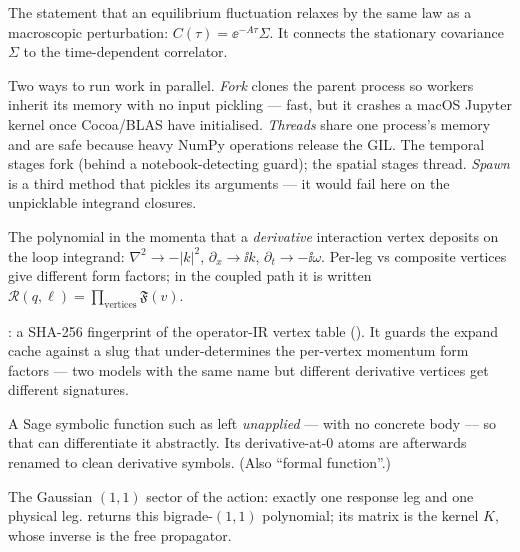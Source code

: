 \begin{description}[leftmargin=0pt,style=nextline]
  \item[Fluctuation--regression (Onsager regression) theorem] The statement that an
        equilibrium fluctuation relaxes by the same law as a macroscopic
        perturbation: $C(\tau)=\ee^{-A\tau}\Sigma$. It connects the stationary
        covariance $\Sigma$ to the time-dependent correlator.

  \item[Fork vs thread parallelism] Two ways to run work in parallel. \emph{Fork}
        clones the parent process so workers inherit its memory with no input
        pickling --- fast, but it crashes a macOS Jupyter kernel once Cocoa/BLAS
        have initialised. \emph{Threads} share one process's memory and are safe
        because heavy NumPy operations release the GIL. The temporal stages fork
        (behind a notebook-detecting guard); the spatial stages thread. \emph{Spawn}
        is a third method that pickles its arguments --- it would fail here on the
        unpicklable integrand closures.

  \item[Form factor] The polynomial in the momenta that a \emph{derivative}
        interaction vertex deposits on the loop integrand:
        $\nabla^{2}\to-|k|^{2}$, $\partial_x\to \ii k$,
        $\partial_t\to-\ii\omega$. Per-leg vs composite vertices give different
        form factors; in the coupled path it is written
        $\mathcal{R}(q,\ell)=\prod_{\text{vertices}}\mathfrak{F}(v)$.

  \item[Form-factor signature] : a SHA-256
        fingerprint of the operator-IR vertex table
        (). It guards the expand cache against
        a slug that under-determines the per-vertex momentum form factors --- two
        models with the same name but different derivative vertices get different
        signatures.

  \item[Formal / undefined function] A Sage symbolic function such as
         left \emph{unapplied} --- with no concrete body
        --- so that  can differentiate it abstractly. Its
        derivative-at-0 atoms are afterwards renamed to clean derivative symbols.
        (Also ``formal function''.)

  \item[Free action / bilinear kernel] The Gaussian $(1,1)$ sector of the action:
        exactly one response leg and one physical leg. 
        returns this bigrade-$(1,1)$ polynomial; its matrix is the kernel $K$, whose
        inverse is the free propagator.


\end{description}
